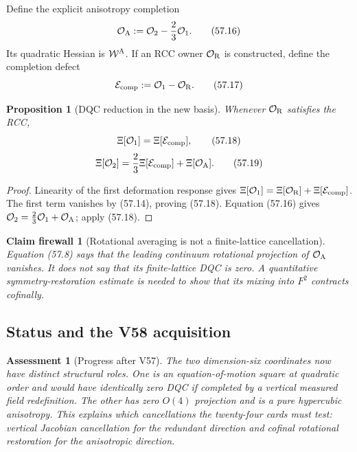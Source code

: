 \documentclass[11pt,oneside]{book}
\newtheorem{proposition}[theorem]{Proposition}
\newtheorem{assessment}[theorem]{Assessment}
\newtheorem{firewall}[theorem]{Claim firewall}
\theoremstyle{definition}
\theoremstyle{remark}
\begin{document}
Define the explicit anisotropy completion
\[
 {\cal O}_{\rm A}:={\cal O}_2-\frac23{\cal O}_1.              \tag{57.16}
\]
Its quadratic Hessian is \({\cal W}^{\rm A}\).  If an RCC owner
\({\cal O}_{\rm R}\) is constructed, define the completion defect
\[
 {\cal E}_{\rm comp}:={\cal O}_1-{\cal O}_{\rm R}.            \tag{57.17}
\]

\begin{proposition}[DQC reduction in the new basis]
\label{prop:e8v57-DQC-basis}
Whenever \({\cal O}_{\rm R}\) satisfies the RCC,
\[
 \Xi[{\cal O}_1]=\Xi[{\cal E}_{\rm comp}],                    \tag{57.18}
\]
\[
 \Xi[{\cal O}_2]
 =\frac23\Xi[{\cal E}_{\rm comp}]
  +\Xi[{\cal O}_{\rm A}].                                    \tag{57.19}
\]
\end{proposition}

\begin{proof}
Linearity of the first deformation response gives
\(\Xi[{\cal O}_1]
=\Xi[{\cal O}_{\rm R}]+\Xi[{\cal E}_{\rm comp}]\).
The first term vanishes by (57.14), proving (57.18).
Equation (57.16) gives
\({\cal O}_2=\frac23{\cal O}_1+{\cal O}_{\rm A}\); apply
(57.18).
\end{proof}

\begin{firewall}[Rotational averaging is not a finite-lattice
cancellation]
\label{fire:e8v57-anisotropy}
Equation (57.8) says that the leading continuum rotational
projection of \({\cal O}_{\rm A}\) vanishes.  It does not say that
its finite-lattice DQC is zero.  A quantitative symmetry-restoration
estimate is needed to show that its mixing into \(F^2\) contracts
cofinally.
\end{firewall}

\subsection{Status and the V58 acquisition}

\begin{assessment}[Progress after V57]
\label{ass:e8v57-status}
The two dimension-six coordinates now have distinct structural
roles.  One is an equation-of-motion square at quadratic order and
would have identically zero DQC if completed by a vertical measured
field redefinition.  The other has zero \(O(4)\) projection and is
a pure hypercubic anisotropy.  This explains which cancellations
the twenty-four cards must test: vertical Jacobian cancellation for
the redundant direction and cofinal rotational restoration for the
anisotropic direction.
\end{assessment}
\end{document}
